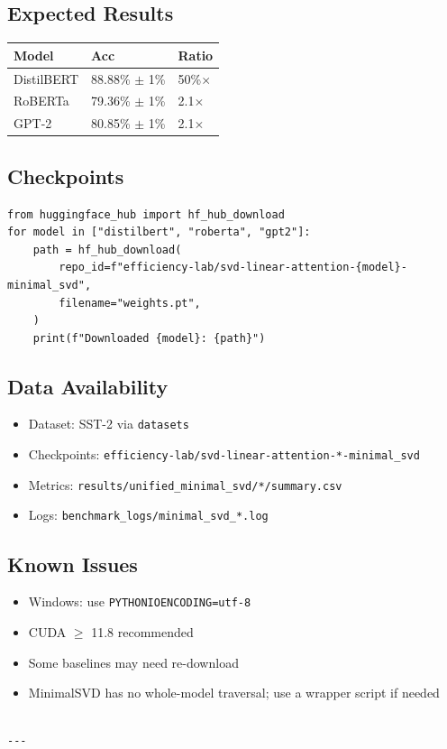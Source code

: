 \subsection{Expected Results}

\begin{table}[H]
\centering
\small
\begin{tabular}{lll}
\toprule
\textbf{Model} & \textbf{Acc} & \textbf{Ratio} \\
\midrule
DistilBERT & 88.88\% $\pm$ 1\% & 50\%$\times$ \\
RoBERTa & 79.36\% $\pm$ 1\% & 2.1$\times$ \\
GPT-2 & 80.85\% $\pm$ 1\% & 2.1$\times$ \\
\bottomrule
\end{tabular}
\end{table}

\subsection{Checkpoints}

\begin{lstlisting}
from huggingface_hub import hf_hub_download
for model in ["distilbert", "roberta", "gpt2"]:
    path = hf_hub_download(
        repo_id=f"efficiency-lab/svd-linear-attention-{model}-minimal_svd",
        filename="weights.pt",
    )
    print(f"Downloaded {model}: {path}")
\end{lstlisting}

\subsection{Data Availability}

\begin{itemize}
\item Dataset: SST-2 via \texttt{datasets}
\item Checkpoints: \texttt{efficiency-lab/svd-linear-attention-*-minimal\_svd}
\item Metrics: \texttt{results/unified\_minimal\_svd/*/summary.csv}
\item Logs: \texttt{benchmark\_logs/minimal\_svd\_*.log}

\end{itemize}
\subsection{Known Issues}

\begin{itemize}
\item Windows: use \texttt{PYTHONIOENCODING=utf-8}
\item CUDA $\ge$ 11.8 recommended
\item Some baselines may need re-download
\item MinimalSVD has no whole-model traversal; use a wrapper script if needed
\end{itemize}
\begin{lstlisting}

---
\end{lstlisting}